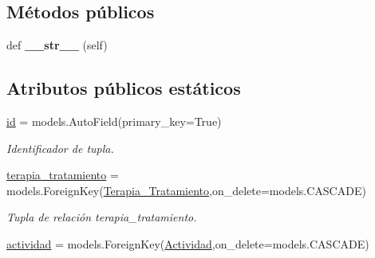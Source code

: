 \subsection*{Métodos públicos}
\begin{DoxyCompactItemize}
\item 
def {\bfseries \+\_\+\+\_\+str\+\_\+\+\_\+} (self)\hypertarget{classappEmotionIOT_1_1models_1_1Sesion_a23dbce02b4c4fcc7479feb3a70e65bf9}{}\label{classappEmotionIOT_1_1models_1_1Sesion_a23dbce02b4c4fcc7479feb3a70e65bf9}

\end{DoxyCompactItemize}
\subsection*{Atributos públicos estáticos}
\begin{DoxyCompactItemize}
\item 
\hyperlink{classappEmotionIOT_1_1models_1_1Sesion_a24241c8647922e6c7332e26d6f11e6a7}{id} = models.\+Auto\+Field(primary\+\_\+key=True)\hypertarget{classappEmotionIOT_1_1models_1_1Sesion_a24241c8647922e6c7332e26d6f11e6a7}{}\label{classappEmotionIOT_1_1models_1_1Sesion_a24241c8647922e6c7332e26d6f11e6a7}

\begin{DoxyCompactList}\small\item\em Identificador de tupla. \end{DoxyCompactList}\item 
\hyperlink{classappEmotionIOT_1_1models_1_1Sesion_a574ab9f9834d41c45a5fb101c99b423b}{terapia\+\_\+tratamiento} = models.\+Foreign\+Key(\hyperlink{classappEmotionIOT_1_1models_1_1Terapia__Tratamiento}{Terapia\+\_\+\+Tratamiento},on\+\_\+delete=models.\+C\+A\+S\+C\+A\+DE)\hypertarget{classappEmotionIOT_1_1models_1_1Sesion_a574ab9f9834d41c45a5fb101c99b423b}{}\label{classappEmotionIOT_1_1models_1_1Sesion_a574ab9f9834d41c45a5fb101c99b423b}

\begin{DoxyCompactList}\small\item\em Tupla de relación terapia\+\_\+tratamiento. \end{DoxyCompactList}\item 
\hyperlink{classappEmotionIOT_1_1models_1_1Sesion_ab60b526717d076b290a76aac0596b98a}{actividad} = models.\+Foreign\+Key(\hyperlink{classappEmotionIOT_1_1models_1_1Actividad}{Actividad},on\+\_\+delete=models.\+C\+A\+S\+C\+A\+DE)\hypertarget{classappEmotionIOT_1_1models_1_1Sesion_ab60b526717d076b290a76aac0596b98a}{}\label{classappEmotionIOT_1_1models_1_1Sesion_ab60b526717d076b290a76aac0596b98a}


\end{DoxyCompactItemize}
